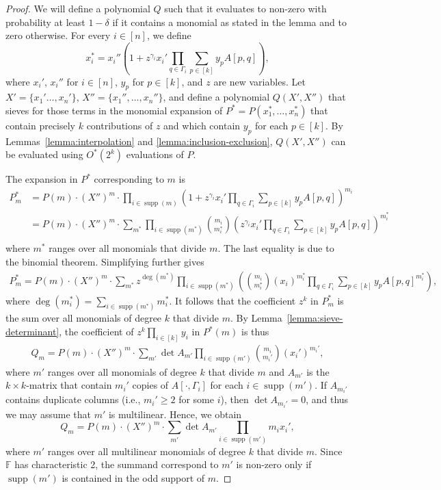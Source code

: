 \documentclass{theoretics}
\newcommand{\F}{\ensuremath{\mathbb F}\xspace}
\DeclareMathOperator{\supp}{supp}
\begin{document}
\begin{proof}
  We will define a polynomial $Q$ such that it evaluates to non-zero with probability at least $1 - \delta$ if it contains a monomial as stated in the lemma and to zero otherwise.
  For every $i \in [n]$, we define
  \[
    x_i^* = x_i'' (1+z^{\gamma_i} x_i' \prod_{q \in \Gamma_i} \sum_{p \in [k]} y_{p} A[p,q]),
  \]
  where $x_i'$, $x_i''$ for $i \in [n]$, $y_p$ for $p \in [k]$, and $z$ are new variables. 
  Let $X' = \{ x_1' \ldots, x_n' \}$, $X'' = \{ x_1'', \ldots, x_n'' \}$, and define a polynomial $Q(X', X'')$ that 
  sieves for those terms in the monomial expansion of
  $P^* = P(x_1^*,\ldots,x_n^*)$ that contain precisely $k$ contributions of $z$ and 
  which contain $y_p$ for each $p \in [k]$.
  By Lemmas~\ref{lemma:interpolation} and \ref{lemma:inclusion-exclusion}, $Q(X', X'')$ can be evaluated using $O^*(2^{k})$ evaluations of $P$.

  The expansion in $P^*$ corresponding to $m$ is
  \begin{align*}
    P^*_m
    &= P(m) \cdot (X'')^m \cdot \prod_{i \in \supp(m)} (1+z^{\gamma_i} x_i' \prod_{q \in \Gamma_i} \sum_{p \in [k]} y_{p} A[p, q])^{m_i} \\
    &= P(m) \cdot (X'')^m \cdot  \sum_{m^*} \prod_{i \in \supp(m^*)} \binom{m_i}{m_i^*} (z^{\gamma_i} x_i' \prod_{q \in \Gamma_i} \sum_{p \in [k]} y_p A[p, q])^{m_i^*} \\
  \end{align*}
  where $m^*$ ranges over all monomials that divide $m$.
  The last equality is due to the binomial theorem.
  Simplifying further gives
  \begin{align*}
  P_m^* = P(m) \cdot (X'')^m \cdot \sum_{m^*} z^{\deg(m^*)} \prod_{i \in \supp(m^*)} \left( \binom{m_i}{m_i^*} (x_i)^{m_i^*} \prod_{q \in \Gamma_i} \sum_{p \in [k]} y_p A[p, q]^{m_i^*} \right),
  \end{align*}
  where $\deg(m_i^*) =\sum_{i \in \supp(m^*)} m_i^*$.
  It follows that the coefficient $z^k$ in $P_m^*$ is the sum over all monomials of degree $k$ that divide $m$.
  By Lemma~\ref{lemma:sieve-determinant}, the coefficient of $z^k \prod_{i \in [k]} y_i$ in $P^*(m)$ is thus
  \begin{align*}
    Q_m = P(m) \cdot (X'')^m \cdot \sum_{m'}  \det A_{m'} \prod_{i \in \supp(m')} \binom{m_i}{m_i'} (x_i')^{m_i'} ,
  \end{align*}
  where $m'$ ranges over all monomials of degree $k$ that divide $m$ and $A_{m'}$ is the $k \times k$-matrix that contain $m_i'$ copies of $A[\cdot, \Gamma_i]$ for each $i \in \supp(m')$.
  If $A_{m_i'}$ contains duplicate columns (i.e., $m_i' \ge 2$ for some $i$), then $\det A_{m_i'} = 0$, and thus we may assume that $m'$ is multilinear.
  Hence, we obtain
  \[
    Q_m = P(m) \cdot (X'')^m \cdot \sum_{m'} \det A_{m'} \prod_{i \in \supp(m')} m_i x_i' ,
  \]
  where $m'$ ranges over all multilinear monomials of degree $k$ that divide $m$.
  Since $\F$ has characteristic 2, the summand correspond to $m'$ is non-zero only if $\supp(m')$ is contained in the odd support of $m$.


\end{proof}
\end{document}
